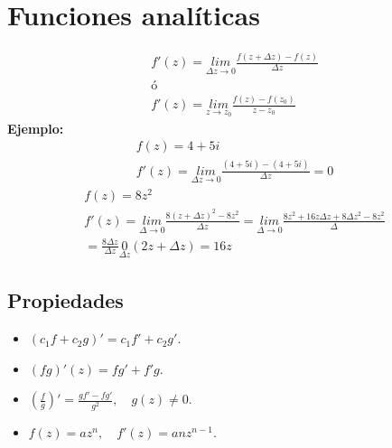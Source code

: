 \documentclass{article}
\begin{document}
\section{Funciones analíticas }
\begin{gather*}
  f'(z) = \underset{\Delta z \rightarrow 0 }{lim}\frac{f(z+\Delta z )- f(z) }{\Delta z } \\
  \text{ó }\\
  f'(z) = \underset{z \rightarrow z_0 }{lim }\frac{f(z) - f(z_0 )}{z - z_0 }
\end{gather*}
\textbf{Ejemplo: }
\begin{gather*}
  f(z) = 4 + 5 i \\
  f'(z) = \underset{\Delta z \rightarrow 0 }{lim }\frac{(4 + 5 i )- (4 + 5i )}{\Delta z } = 0 
\end{gather*}
\begin{gather*}
  f(z) = 8 z ^2\\
  f'(z) = \underset{\Delta \rightarrow  0 }{lim }\frac{8 (z + \Delta z ) ^2 - 8 z ^2 }{\Delta z } = \underset{\Delta \rightarrow 0 }{lim } \frac{8 z ^2 + 16 z \Delta z + 8 \Delta z ^2 - 8 z ^2 }{\Delta} \\
  = \frac{8 \Delta z }{\Delta z } \underset{\Delta z }{0 }(2z + \Delta z ) = 16 z 
\end{gather*}

\subsection{Propiedades }
\begin{itemize}
  \item $ (c_1 f + c_2 g )' = c_1 f ' + c_2 g'  $.
  \item $ (f g )' (z) = f g' + f' g  $.
  \item $ \left(\frac{f }{g }\right)' = \frac{g f ' - f g' }{g ^2 }, \quad g(z) \neq 0 $.
  \item $ f(z) = a z ^ {n }, \quad f'(z) = a n z ^ {n - 1 } $.
\end{itemize}
\end{document}
